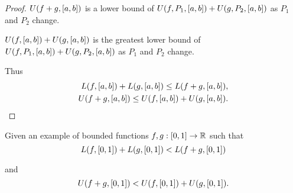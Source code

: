 \begin{proof}
    $U(f + g, \left[{a, b}\right])$ is a lower bound of $U(f, P_{1}, \left[{a, b}\right]) + U(g, P_{2}, \left[{a, b}\right])$ as $P_{1}$ and $P_{2}$ change.

    $U(f, \left[{a,b}\right]) + U(g, \left[{a, b}\right])$ is the greatest lower bound of $U(f, P_{1}, \left[{a, b}\right]) + U(g, P_{2}, \left[{a, b}\right])$ as $P_{1}$ and $P_{2}$ change.

    Thus
    \begin{align*}
        L(f, \left[{a,b}\right]) + L(g, \left[{a,b}\right]) \leq L(f + g, \left[{a,b}\right]), \\
        U(f + g, \left[{a,b}\right]) \leq U(f, \left[{a,b}\right]) + U(g, \left[{a, b}\right]).
    \end{align*}
\end{proof}
\newpage

\begin{exercise}\label{chapter1:sectionB:exercise4}
    Given an example of bounded functions $f, g: \left[{0, 1}\right]\to \mathbb{R}$ such that
    \[
        L(f, \left[{0,1}\right]) + L(g, \left[{0,1}\right]) < L(f + g, \left[{0, 1}\right])
    \]

    and
    \[
        U(f + g, \left[{0,1}\right]) < U(f, \left[{0,1}\right]) + U(g, \left[{0, 1}\right]).
    \]
\end{exercise}


